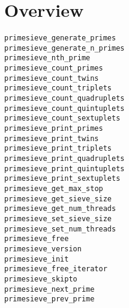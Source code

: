 \documentclass{report}
\begin{document}
\section{Overview}
\begin{description}
\item[\texttt{\begin{ttfamily}primesieve{\_}iterator\end{ttfamily} Record}]
\end{description}
\begin{description}
\item[\texttt{primesieve{\_}generate{\_}primes}]
\item[\texttt{primesieve{\_}generate{\_}n{\_}primes}]
\item[\texttt{primesieve{\_}nth{\_}prime}]
\item[\texttt{primesieve{\_}count{\_}primes}]
\item[\texttt{primesieve{\_}count{\_}twins}]
\item[\texttt{primesieve{\_}count{\_}triplets}]
\item[\texttt{primesieve{\_}count{\_}quadruplets}]
\item[\texttt{primesieve{\_}count{\_}quintuplets}]
\item[\texttt{primesieve{\_}count{\_}sextuplets}]
\item[\texttt{primesieve{\_}print{\_}primes}]
\item[\texttt{primesieve{\_}print{\_}twins}]
\item[\texttt{primesieve{\_}print{\_}triplets}]
\item[\texttt{primesieve{\_}print{\_}quadruplets}]
\item[\texttt{primesieve{\_}print{\_}quintuplets}]
\item[\texttt{primesieve{\_}print{\_}sextuplets}]
\item[\texttt{primesieve{\_}get{\_}max{\_}stop}]
\item[\texttt{primesieve{\_}get{\_}sieve{\_}size}]
\item[\texttt{primesieve{\_}get{\_}num{\_}threads}]
\item[\texttt{primesieve{\_}set{\_}sieve{\_}size}]
\item[\texttt{primesieve{\_}set{\_}num{\_}threads}]
\item[\texttt{primesieve{\_}free}]
\item[\texttt{primesieve{\_}version}]
\item[\texttt{primesieve{\_}init}]
\item[\texttt{primesieve{\_}free{\_}iterator}]
\item[\texttt{primesieve{\_}skipto}]
\item[\texttt{primesieve{\_}next{\_}prime}]
\item[\texttt{primesieve{\_}prev{\_}prime}]
\end{description}
\end{document}
